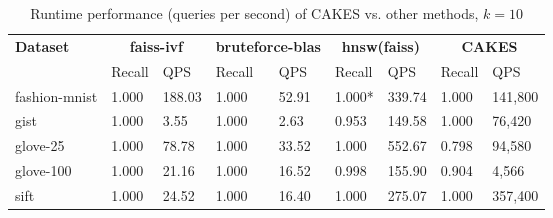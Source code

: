 \begin{table*}[!t]
    \caption{Runtime performance (queries per second) of CAKES vs. other methods, $k=10$}
    \label{table:results:ann-10}
    \vskip 0.15in
    \begin{center}
    \begin{small}
    \begin{sc}
    \begin{tabular}{|l|p{1cm}|p{1cm}|p{1cm}|p{1cm}|p{1cm}|p{1cm}|p{1cm}|p{1cm}|}
    \textbf{Dataset}  & \multicolumn{2}{|c|}{\textbf{faiss-ivf}} & \multicolumn{2}{|c|}{\textbf{bruteforce-blas}} & \multicolumn{2}{|c|}{\textbf{hnsw(faiss)}} & \multicolumn{2}{|c|}{\textbf{CAKES}} \\
    \cline{2-9}
    &               Recall & QPS      & Recall & QPS    & Recall & QPS    & Recall & QPS \\
    \hline
    fashion-mnist & 1.000  & 188.03    & 1.000 & 52.91  & 1.000* & 339.74 & 1.000 & 141,800 \\
    \hline
    gist          & 1.000 & 3.55  & 1.000 & 2.63        & 0.953 & 149.58  & 1.000 & 76,420 \\
    \hline
    glove-25      & 1.000 & 78.78  & 1.000 & 33.52      & 1.000 & 552.67  & 0.798 & 94,580 \\
    \hline
    glove-100     & 1.000 & 21.16  & 1.000 & 16.52      & 0.998 & 155.90  & 0.904 & 4,566 \\
    \hline
    sift          & 1.000 &  24.52 & 1.000 & 16.40      & 1.000 & 275.07  & 1.000 & 357,400 \\
    \hline
    \end{tabular}
    \end{sc}
    \end{small}
    \end{center}
    \vskip -0.1in
    \end{table*}


